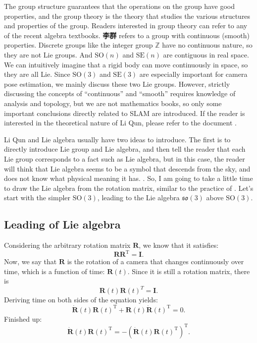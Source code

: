  The group structure guarantees that the operations on the group have good properties, and the group theory is the theory that studies the various structures and properties of the group. Readers interested in group theory can refer to any of the recent algebra textbooks. \textbf{李群} refers to a group with continuous (smooth) properties. Discrete groups like the integer group $\mathbb{Z}$ have no continuous nature, so they are not Lie groups. And $\mathrm{SO}(n)$ and $\mathrm{SE}(n)$ are contiguous in real space. We can intuitively imagine that a rigid body can move continuously in space, so they are all Lie. Since $\mathrm{SO}(3)$ and $\mathrm{SE}(3)$ are especially important for camera pose estimation, we mainly discuss these two Lie groups. However, strictly discussing the concepts of “continuous” and “smooth” requires knowledge of analysis and topology, but we are not mathematics books, so only some important conclusions directly related to SLAM are introduced. If the reader is interested in the theoretical nature of Li Qun, please refer to the document \cite{Varadarajan2013}.

  Li Qun and Lie algebra usually have two ideas to introduce. The first is to directly introduce Lie group and Lie algebra, and then tell the reader that each Lie group corresponds to a fact such as Lie algebra, but in this case, the reader will think that Lie algebra seems to be a symbol that descends from the sky, and does not know what physical meaning it has. . So, I am going to take a little time to draw the Lie algebra from the rotation matrix, similar to the practice of \cite{Ma2012}. Let's start with the simpler $\mathrm{SO}(3)$, leading to the Lie algebra $\mathfrak{so}(3)$ above $\mathrm{SO}(3)$.

  \subsection{Leading of Lie algebra}
  
  
  Considering the arbitrary rotation matrix $\bm{R}$, we know that it satisfies:
  \begin{equation}
  \bm{R} \bm{R}^\mathrm{T}=\bm{I}.
  \end{equation}
  Now, we say that $\bm{R}$ is the rotation of a camera that changes continuously over time, which is a function of time: $\bm{R}(t)$. Since it is still a rotation matrix, there is
  \[
    \bm{R}(t) \bm{R}(t) ^T = \bm{I}.
    \]
    Deriving time on both sides of the equation yields:
    \[
      \bm{\dot{R}} (t) \bm{R} {(t)^\mathrm{T}} + \bm{R} (t) \bm{\dot{R}} {(t) ^\mathrm{T}} = 0.
      \]
      Finished up:
      \begin{equation}
      \bm{\dot{R}} (t) \bm{R} {(t)^\mathrm{T}} = - \left( \bm{\dot{R}} (t) \bm{R} {(t)^\mathrm{T}} \right)^\mathrm{T} .
      \end{equation}

